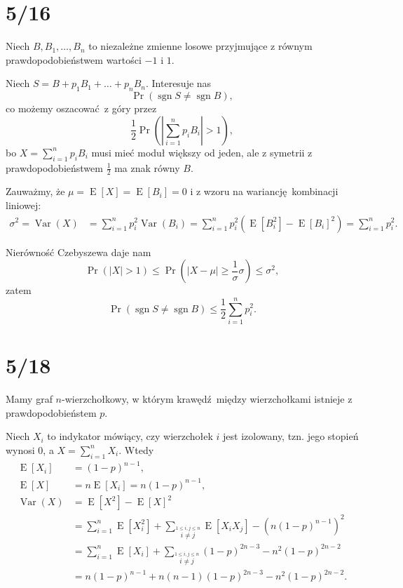 \documentclass[a4paper, 12pt]{article}
\title{}
\author{Wiktor Kuchta}
\date{\vspace{-4ex}}
\DeclareMathOperator{\sgn}{sgn}
\newcommand{\modulus}[1]{\left| #1 \right|}
\newcommand{\abs}{\modulus}
\DeclareMathOperator{\EX}{E}
\DeclareMathOperator{\Var}{Var}
\begin{document}
\maketitle

\section*{5/16}
Niech $B, B_1, …, B_n$ to niezależne zmienne losowe przyjmujące z równym
prawdopodobieństwem wartości $-1$ i $1$.

Niech $S = B + p_1B_1 + … + p_nB_n.$
Interesuje nas
$$\Pr\left( \sgn S ≠ \sgn B\right),$$
co możemy oszacować z góry przez
$$\frac{1}{2}\Pr \left(\abs{∑_{i=1}^n p_i B_i} > 1\right),$$
bo $X = ∑_{i=1}^n p_i B_i$ musi mieć moduł większy od jeden, ale
z symetrii z prawdopodobieństwem $\frac{1}{2}$ ma znak równy $B$.

Zauważmy, że $μ = \EX[X] = \EX[B_i] = 0$ i z wzoru na wariancję kombinacji liniowej:
\begin{align*}
	σ^2 = \Var(X) &= ∑_{i=1}^n p_i^2 \Var(B_i) = ∑_{i=1}^n p_i^2 (\EX[B_i^2] - \EX[B_i]^2) = ∑_{i=1}^n p_i^2.
\end{align*}

Nierówność Czebyszewa daje nam
$$\Pr(|X|>1) ≤ \Pr\left(|X-μ| ≥ \frac{1}{σ}σ\right) ≤ σ^2,$$
zatem
$$\Pr(\sgn S ≠ \sgn B) ≤ \frac{1}{2}∑_{i=1}^n p_i^2.$$

\newpage

\section*{5/18}

Mamy graf $n$-wierzchołkowy,
w którym krawędź między wierzchołkami istnieje z prawdopodobieństem $p$.

Niech $X_i$ to indykator mówiący, czy wierzchołek $i$ jest izolowany,
tzn. jego stopień wynosi $0$, a $X = ∑_{i=1}^n X_i$.
Wtedy
\begin{align*}
	\EX [X_i] &= (1-p)^{n-1}, \\
	\EX [X] &= n \EX [X_i] = n (1-p)^{n-1}, \\
	\Var(X) &= \EX[X^2] - \EX[X]^2 \\
			&= ∑_{i=1}^n \EX[X_i^2] + ∑_{\stackrel{1 ≤ i, j ≤ n}{i≠j}} \EX[X_i X_j] - (n(1-p)^{n-1})^2 \\
			&= ∑_{i=1}^n \EX[X_i] + ∑_{\stackrel{1 ≤ i, j ≤ n}{i≠j}} (1-p)^{2n-3} - n^2(1-p)^{2n-2} \\
			&= n (1-p)^{n-1} + n(n-1) (1-p)^{2n-3} - n^2(1-p)^{2n-2}.
\end{align*}
\end{document}
